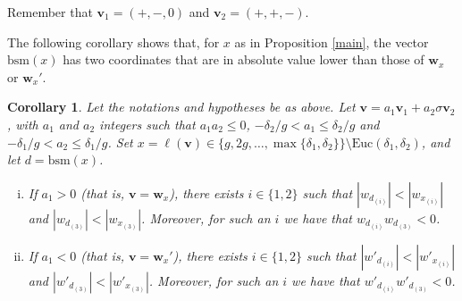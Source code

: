 \documentclass[11pt]{amsart}
\newtheorem{corollary}[theorem]{Corollary}
\theoremstyle{remark}
\begin{document}
Remember that $\mathbf v_1=(+,-,0)$ and $\mathbf v_2=(+,+,-)$.

The following corollary shows that, for $x$ as in Proposition \ref{main}, the vector $\mathrm{bsm}(x)$ has two coordinates that are in absolute value lower than those of $\mathbf w_x$ or $\mathbf w_x'$.


\begin{corollary}\label{elmenor}
Let the notations and hypotheses be as above. Let $\mathbf v=a_1 \mathbf v_1+a_2\sigma\mathbf v_2$, with $a_1$ and $a_2$ integers such that $a_1a_2\le 0$, $-\delta_2/g<a_1\le \delta_2/g$ and  $-\delta_1/g<a_2\le \delta_1/g$. Set $x=\ell(\mathbf v)\in \{g,2g,\ldots, \max\{\delta_1,\delta_2\}\}\setminus \mathrm {Euc}(\delta_1,\delta_2)$, and let $d=\mathrm{bsm}(x)$. 
		\begin{enumerate}[(i)]
			\item If $a_1>0$ (that is, $\mathbf v=\mathbf w_x$), there exists $i\in\{1,2\}$ such that $|w_{d_{(i)}}|<|w_{x_{(i)}}|$  and $|w_{d_{(3)}}|<|w_{x_{(3)}}|$. Moreover, for such an $i$ we have that  $w_{d_{(i)}}w_{d_{(3)}}<0$.
			\item If $a_1<0$ (that is, $\mathbf v=\mathbf w_x'$), there exists $i\in\{1,2\}$ such that $|w'_{d_{(i)}}|<|w'_{x_{(i)}}|$ and $|w'_{d_{(3)}}|<|w'_{x_{(3)}}|$. Moreover, for such an $i$ we have that $w'_{d_{(i)}}w'_{d_{(3)}}<0$. 
		\end{enumerate}
\end{corollary}
\end{document}
